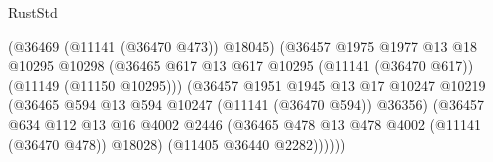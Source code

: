 \begin{lexlean}{RustStd}
\begin{coremodule}
                                              (@36469 (@11141 (@36470 @473)) @18045)
                                              (@36457
                                                @1975
                                                @1977
                                                @13
                                                @18
                                                @10295
                                                @10298
                                                (@36465
                                                  @617
                                                  @13
                                                  @617
                                                  @10295
                                                  (@11141 (@36470 @617))
                                                  (@11149 (@11150 @10295)))
                                                (@36457
                                                  @1951
                                                  @1945
                                                  @13
                                                  @17
                                                  @10247
                                                  @10219
                                                  (@36465
                                                    @594
                                                    @13
                                                    @594
                                                    @10247
                                                    (@11141 (@36470 @594))
                                                    @36356)
                                                  (@36457
                                                    @634
                                                    @112
                                                    @13
                                                    @16
                                                    @4002
                                                    @2446
                                                    (@36465
                                                      @478
                                                      @13
                                                      @478
                                                      @4002
                                                      (@11141 (@36470 @478))
                                                      @18028)
                                                    (@11405 @36440 @2282))))))

\end{coremodule}
\end{lexlean}
